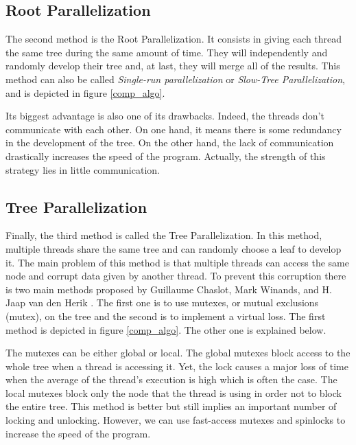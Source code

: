\subsection{Root Parallelization}

The second method is the Root Parallelization. It consists in giving each thread the same tree during the same amount of time. They will independently and randomly develop their tree and, at last, they will merge all of the results. This method can also be called \emph{Single-run parallelization} or \emph{Slow-Tree Parallelization}, and is depicted in figure \ref{comp_algo}.
\newline

Its biggest advantage is also one of its drawbacks. Indeed, the threads don’t communicate with each other. On one hand, it means there is some redundancy in the development of the tree. On the other hand, the lack of communication drastically increases the speed of the program. Actually, the strength of this strategy lies in little communication.

\subsection{Tree Parallelization}

Finally, the third method is called the Tree Parallelization. In this method, multiple threads share the same tree and can randomly choose a leaf to develop it. The main problem of this method is that multiple threads can access the same node and corrupt data given by another thread. To prevent this corruption there is two main methods proposed by Guillaume Chaslot, Mark Winands, and H. Jaap van den Herik \cite{parallel_comp}. The first one is to use mutexes, or mutual exclusions (mutex), on the tree and the second is to implement a virtual loss. The first method is depicted in figure \ref{comp_algo}. The other one is explained below.
\newline

The mutexes can be either global or local. The global mutexes block access to the whole tree when a thread is accessing it. Yet, the lock causes a major loss of time when the average of the thread’s execution is high which is often the case. The local mutexes block only the node that the thread is using in order not to block the entire tree. This method is better but still implies an important number of locking and unlocking. However, we can use fast-access mutexes and spinlocks to increase the speed of the program.
\newline

